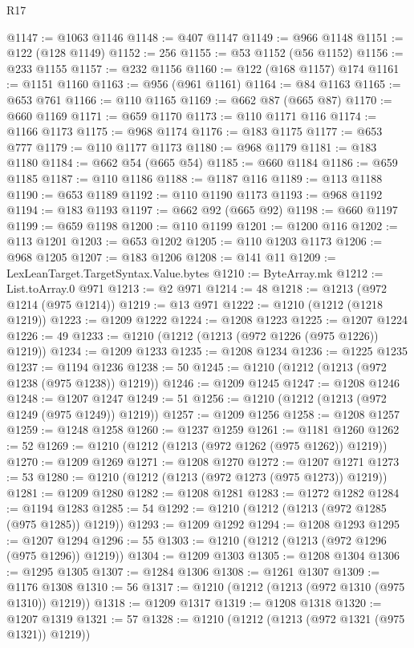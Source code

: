 \begin{lexlean}{R17}
\begin{coremodule}
{{{{{{{{{{{{{{{{{{{{{{{{{{{{{{{{{{{{{{{{{{{{{{{{{{{{{{{{{{{{{{{{{{{{{{{{{{{{{{{{{{{{{@1147 := @1063 @1146
@1148 := @407 @1147
@1149 := @966 @1148
@1151 := @122 (@128 @1149)
@1152 := 256
@1155 := @53 @1152 (@56 @1152)
@1156 := @233 @1155
@1157 := @232 @1156
@1160 := @122 (@168 @1157) @174
@1161 := @1151 @1160
@1163 := @956 (@961 @1161)
@1164 := @84 @1163
@1165 := @653 @761
@1166 := @110 @1165
@1169 := @662 @87 (@665 @87)
@1170 := @660 @1169
@1171 := @659 @1170
@1173 := @110 @1171 @116
@1174 := @1166 @1173
@1175 := @968 @1174
@1176 := @183 @1175
@1177 := @653 @777
@1179 := @110 @1177 @1173
@1180 := @968 @1179
@1181 := @183 @1180
@1184 := @662 @54 (@665 @54)
@1185 := @660 @1184
@1186 := @659 @1185
@1187 := @110 @1186
@1188 := @1187 @116
@1189 := @113 @1188
@1190 := @653 @1189
@1192 := @110 @1190 @1173
@1193 := @968 @1192
@1194 := @183 @1193
@1197 := @662 @92 (@665 @92)
@1198 := @660 @1197
@1199 := @659 @1198
@1200 := @110 @1199
@1201 := @1200 @116
@1202 := @113 @1201
@1203 := @653 @1202
@1205 := @110 @1203 @1173
@1206 := @968 @1205
@1207 := @183 @1206
@1208 := @141 @11
@1209 := LexLeanTarget.TargetSyntax.Value.bytes
@1210 := ByteArray.mk
@1212 := List.toArray.{0} @971
@1213 := @2 @971
@1214 := 48
@1218 := @1213 (@972 @1214 (@975 @1214))
@1219 := @13 @971
@1222 := @1210 (@1212 (@1218 @1219))
@1223 := @1209 @1222
@1224 := @1208 @1223
@1225 := @1207 @1224
@1226 := 49
@1233 := @1210 (@1212 (@1213 (@972 @1226 (@975 @1226)) @1219))
@1234 := @1209 @1233
@1235 := @1208 @1234
@1236 := @1225 @1235
@1237 := @1194 @1236
@1238 := 50
@1245 := @1210 (@1212 (@1213 (@972 @1238 (@975 @1238)) @1219))
@1246 := @1209 @1245
@1247 := @1208 @1246
@1248 := @1207 @1247
@1249 := 51
@1256 := @1210 (@1212 (@1213 (@972 @1249 (@975 @1249)) @1219))
@1257 := @1209 @1256
@1258 := @1208 @1257
@1259 := @1248 @1258
@1260 := @1237 @1259
@1261 := @1181 @1260
@1262 := 52
@1269 := @1210 (@1212 (@1213 (@972 @1262 (@975 @1262)) @1219))
@1270 := @1209 @1269
@1271 := @1208 @1270
@1272 := @1207 @1271
@1273 := 53
@1280 := @1210 (@1212 (@1213 (@972 @1273 (@975 @1273)) @1219))
@1281 := @1209 @1280
@1282 := @1208 @1281
@1283 := @1272 @1282
@1284 := @1194 @1283
@1285 := 54
@1292 := @1210 (@1212 (@1213 (@972 @1285 (@975 @1285)) @1219))
@1293 := @1209 @1292
@1294 := @1208 @1293
@1295 := @1207 @1294
@1296 := 55
@1303 := @1210 (@1212 (@1213 (@972 @1296 (@975 @1296)) @1219))
@1304 := @1209 @1303
@1305 := @1208 @1304
@1306 := @1295 @1305
@1307 := @1284 @1306
@1308 := @1261 @1307
@1309 := @1176 @1308
@1310 := 56
@1317 := @1210 (@1212 (@1213 (@972 @1310 (@975 @1310)) @1219))
@1318 := @1209 @1317
@1319 := @1208 @1318
@1320 := @1207 @1319
@1321 := 57
@1328 := @1210 (@1212 (@1213 (@972 @1321 (@975 @1321)) @1219))
}}}}}}}}}}}}}}}}}}}}}}}}}}}}}}}}}}}}}}}}}}}}}}}}}}}}}}}}}}}}}}}}}}}}}}}}}}}}}}}}}}}}}
\end{coremodule}
\end{lexlean}
